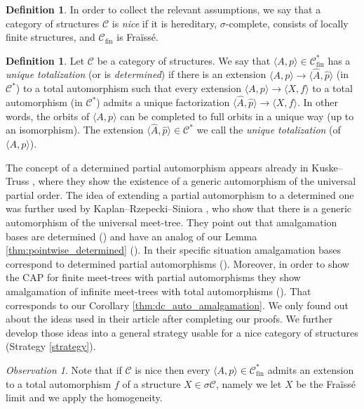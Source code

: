\documentclass[10pt,a4paper]{article}
\theoremstyle{definition}
\newtheorem{df}[tw]{Definition}
\theoremstyle{remark}
\newtheorem{observation}[tw]{Observation}
\newcommand \seq [1]{\langle #1 \rangle}
\newcommand \C {\mathscr{C}}
\newcommand \fin {{\operatorname{fin}}}
\begin{document}
\begin{df}\label{nice}
    In order to collect the relevant assumptions, we say that a category of structures $\C$ is \emph{nice} if it is hereditary, $\sigma$-complete, consists of locally finite structures, and $\C_\fin$ is Fraïssé.
\end{df}





\begin{df}
  Let $\C$ be a category of structures. 
    We say that $\seq{A, p} \in \C^*_\fin$ has a \emph{unique totalization} (or is \emph{determined}) if there is an extension $\seq{A, p} \to \seq{\hat{A}, \hat{p}}$ (in $\C^*$) to a total automorphism such that every extension $\seq{A, p} \to \seq{X, f}$ to a total automorphism (in $\C^*$) admits a unique factorization $\seq{\hat{A}, \hat{p}} \to \seq{X, f}$.
    In other words, the orbits of $\seq{A, p}$ can be completed to full orbits in a unique way (up to an isomorphism).
    The extension $\seq{\hat{A}, \hat{p}}\in \C^*$ we call the \emph{unique totalization} (of $\seq{A, p}$).
\end{df}

The concept of a determined partial automorphism appears already in Kuske--Truss \cite{KuTr}, where they show the existence of a generic automorphism of the universal partial order. The idea of extending a partial automorphism to a determined one was further used by Kaplan--Rzepecki--Siniora \cite{KaRzSi}, who show that there is a generic automorphism of the universal meet-tree. They point out that amalgamation bases are determined (\cite[Proposition 4.2]{KaRzSi}) and have an analog of our Lemma \ref{thm:pointwise_determined}  (\cite[Lemma 4.11]{KaRzSi}). In their specific situation amalgamation bases correspond to determined partial automorphisms (\cite[Corollary 4.19]{KaRzSi}).
Moreover, in order to show the CAP for finite meet-trees with partial automorphisms they show amalgamation of infinite meet-trees with total automorphisms (\cite[Lemma 4.16]{KaRzSi}). That corresponds to our Corollary \ref{thm:dc_auto_amalgamation}.
We only found out about the ideas used in their article after completing our proofs. We further develop those ideas into a general strategy usable for a nice category of structures (Strategy \ref{strategy}).



\begin{observation} \label{obs:totalization_exists}
Note that if $\C$ is nice then every $\seq{A, p} \in \C_\fin^*$ admits an extension to a total automorphism $f$ of a structure $X \in \sigma\C$, namely we let $X$ be the Fraïssé limit and we apply the homogeneity.
\end{observation}
\end{document}
